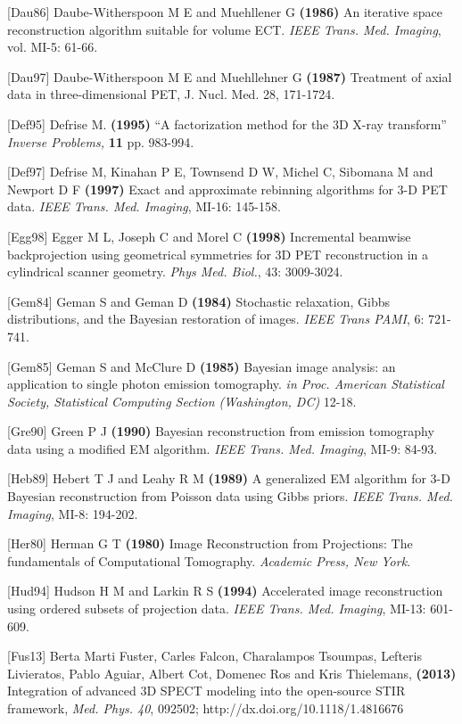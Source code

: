 \documentclass{article}
\begin{document}
{{{[}Dau86] Daube-Witherspoon M E and Muehllener G \textbf{(1986)} An 
iterative space reconstruction algorithm suitable for volume 
ECT. \textit{IEEE Trans. Med. Imaging}, vol. MI-5: 61-66.

{[}Dau97] Daube-Witherspoon M E and Muehllehner G \textbf{(1987)} 
Treatment of axial data in three-dimensional PET, 
J. Nucl. Med. 28, 171-1724.

{[}Def95] Defrise M. \textbf{(1995)} ``A factorization method for the 
3D X-ray transform'' \textit{Inverse Problems,} \textbf{11} pp. 983-994.


{[}Def97] Defrise M, Kinahan P E, Townsend D W, Michel C, Sibomana 
M and Newport D F \textbf{(1997)} Exact and approximate rebinning 
algorithms for 3-D PET data. \textit{IEEE Trans. Med. Imaging}, MI-16: 
145-158.

{[}Egg98] Egger M L, Joseph C and Morel C \textbf{(1998)} Incremental 
beamwise backprojection using geometrical symmetries for 3D PET 
reconstruction in a cylindrical scanner geometry. \textit{Phys Med. 
Biol.}, 43: 3009-3024.


{[}Gem84] Geman S and Geman D \textbf{(1984)} Stochastic relaxation, 
Gibbs distributions, and the Bayesian restoration of images. \textit{IEEE 
Trans PAMI}, 6: 721-741.

{[}Gem85] Geman S and McClure D \textbf{(1985)} Bayesian image analysis: 
an application to single photon emission tomography. \textit{in Proc. 
American Statistical Society, Statistical Computing Section (Washington, 
DC)} 12-18.


 {[}Gre90] Green P J \textbf{(1990)} Bayesian reconstruction from emission 
tomography data using a modified EM algorithm. \textit{IEEE Trans. 
Med. Imaging}, MI-9: 84-93.


{[}Heb89] Hebert T J and Leahy R M \textbf{(1989)} A generalized EM 
algorithm for 3-D Bayesian reconstruction from Poisson data using 
Gibbs priors. \textit{IEEE Trans. Med. Imaging}, MI-8: 194-202.


{[}Her80] Herman G T \textbf{(1980)} Image Reconstruction from Projections: 
The fundamentals of Computational Tomography. \textit{Academic Press, 
New York}.

{[}Hud94] Hudson H M and Larkin R S \textbf{(1994)} Accelerated image 
reconstruction using ordered subsets of projection data. \textit{IEEE 
Trans. Med. Imaging}, MI-13: 601-609.

{[}Fus13]  Berta Marti Fuster, Carles Falcon, Charalampos Tsoumpas, Lefteris Livieratos, Pablo Aguiar, Albert Cot, Domenec Ros and Kris Thielemans,
  \textbf{ (2013)}
  Integration of advanced 3D SPECT modeling into the open-source STIR framework,
  \textit{Med. Phys. 40}, 092502; http://dx.doi.org/10.1118/1.4816676

}}
\end{document}

